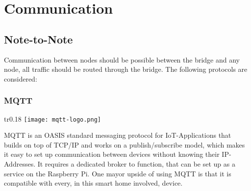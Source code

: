 
    \section{Communication}
    
        \subsection{Note-to-Note}
        Communication between nodes should be possible between the bridge and
        any node, all traffic should be routed through the bridge.
        The following protocols are considered:
            \subsubsection{MQTT}
            \begin{wrapfigure}[2]{tr}{0.18\textwidth} %
                \vspace{-1cm}
                \hspace{3cm}
                \texttt{[image: mqtt-logo.png]}
            \end{wrapfigure}
            MQTT \cite{mqtt_nodate} is an OASIS standard messaging protocol for 
            IoT-Applications that builds on top of TCP/IP and 
            works on a publish/subscribe model, which makes it easy
            to set up communication between devices without knowing
            their IP-Addresses. It requires a dedicated broker to
            function, that can be set up as a service on the 
            Raspberry Pi.
            One mayor upside of using MQTT is that it is compatible
            with every, in this smart home involved, device.
        
        
